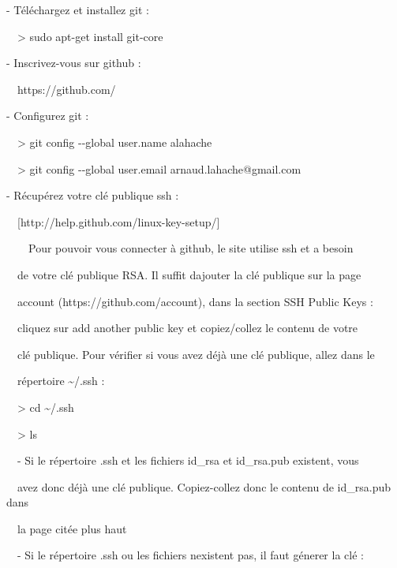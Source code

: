 \documentclass{article}
\begin{document}
\bigskip

{}- Téléchargez et installez git :

\ \ {\textgreater} sudo apt-get install git-core


\bigskip


\bigskip

{}- Inscrivez-vous sur github :

\ \ https://github.com/


\bigskip


\bigskip

{}- Configurez git :

\ \ {\textgreater} git config -{}-global user.name
{\textquotedbl}alahache{\textquotedbl}

\ \ {\textgreater} git config -{}-global user.email
arnaud.lahache@gmail.com


\bigskip


\bigskip

{}- Récupérez votre clé publique ssh :

\ \ [http://help.github.com/linux-key-setup/]


\bigskip

\ \ \ \ Pour pouvoir vous connecter à github, le site utilise ssh et a
besoin

\ \ de votre clé publique RSA. Il suffit d{\textquotesingle}ajouter la
clé publique sur la page

\ \ {\textquotedbl}account{\textquotedbl} (https://github.com/account),
dans la section {\textquotedbl}SSH Public Keys{\textquotedbl} :

\ \ cliquez sur {\textquotedbl}add another public key{\textquotedbl} et
copiez/collez le contenu de votre

\ \ clé publique. Pour vérifier si vous avez déjà une clé publique,
allez dans le

\ \ répertoire \~{}/.ssh :


\bigskip

\ \ {\textgreater} cd \~{}/.ssh

\ \ {\textgreater} ls


\bigskip

\ \ {}- Si le répertoire .ssh et les fichiers id\_rsa et id\_rsa.pub
existent, vous

\ \ avez donc déjà une clé publique. Copiez-collez donc le contenu de
id\_rsa.pub dans

\ \ la page citée plus haut


\bigskip

\ \ {}- Si le répertoire .ssh ou les fichiers
n{\textquotesingle}existent pas, il faut génerer la clé :
\end{document}
